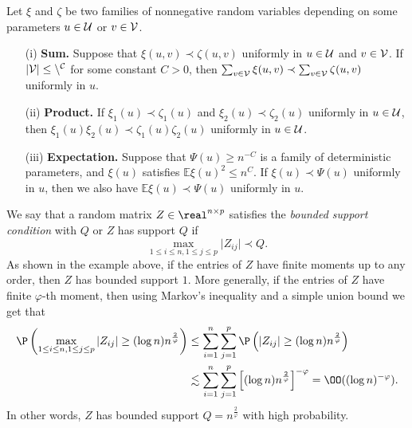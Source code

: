 \documentclass[aos,preprint]{imsart}
\begin{document}
\begin{lemma}\label{lem_stodomin}
Let $\xi$ and $\zeta$ be two families of nonnegative random variables depending on some parameters $u\in \cal U$ or $v\in \cal V$.
\begin{itemize}
\item[(i)] {\bf Sum.} Suppose that $\xi (u,v)\prec \zeta(u,v)$ uniformly in $u\in \cal U$ and $v\in \cal V$. If $|\cal V|\le n^C$ for some constant $C>0$, then $\sum_{v\in \cal V} \xi(u,v) \prec \sum_{v\in \cal V} \zeta(u,v)$ uniformly in $u$.

\item[(ii)] {\bf Product.} If $\xi_1 (u)\prec \zeta_1(u)$ and $\xi_2 (u)\prec  \zeta_2(u)$ uniformly in $u\in \cal U$, then $\xi_1(u)\xi_2(u) \prec \zeta_1(u) \zeta_2(u)$ uniformly in $u\in \cal U$.

\item[(iii)] {\bf Expectation.} Suppose that $\Psi(u)\ge n^{-C}$ is a family of deterministic parameters, and $\xi(u)$ satisfies $\mathbb E\xi(u)^2 \le n^C$. If $\xi(u)\prec \Psi(u)$ uniformly in $u$, then we also have $\mathbb E\xi(u) \prec \Psi(u)$ uniformly in $u$.
\end{itemize}
\end{lemma}

 


We say that a random matrix $Z \in\real^{n \times p}$ satisfies the {\it{bounded support condition}} with $Q$ or $Z$ has support $Q$ if
\begin{equation}
	\max_{1\le i \le n, 1 \le j \le p}\vert Z_{i j} \vert \prec Q. \label{eq_support}
\end{equation}
As shown in the example above, if the entries of $Z$ have finite moments up to any order, then $Z$ has bounded support $1$.
More generally, if the entries of $Z$ have finite $\varphi$-th moment, then using Markov's inequality and a simple union bound we get that %
\begin{align}
	\P\left(\max_{1\le i\le n, 1\le j \le p}|Z_{i  j}|\ge (\log n) n^{\frac{2}{\varphi}}\right) &\le \sum_{i=1}^n \sum_{j=1}^p \P\left(|Z_{i j}|\ge (\log n) n^{\frac{2}{\varphi}}\right)  \nonumber\\
	&\lesssim \sum_{i=1}^n \sum_{j=1}^p  \left[(\log n) n^{\frac{2}{\varphi}}\right]^{-\varphi} = \OO((\log n)^{-\varphi}).\label{Ptrunc}
	\end{align}
In other words, $Z$ has bounded support $Q=n^{\frac{2}{\varphi}}$ with high probability.
\end{document}
